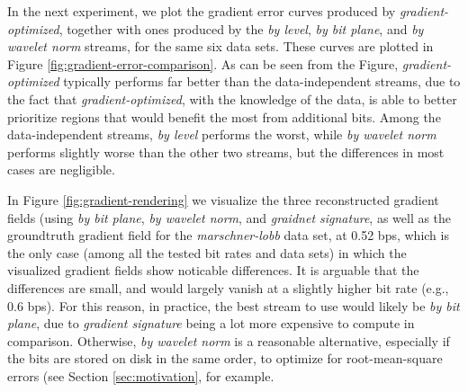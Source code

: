 In the next experiment, we plot the gradient error curves produced by \emph{gradient-optimized},
together with ones produced by the \emph{by level}, \emph{by bit plane}, and \emph{by wavelet norm}
streams, for the same six data sets. These curves are plotted in Figure
\ref{fig:gradient-error-comparison}. As can be seen from the Figure, \emph{gradient-optimized}
typically performs far better than the data-independent streams, due to the fact that
\emph{gradient-optimized}, with the knowledge of the data, is able to better prioritize regions that
would benefit the most from additional bits. Among the data-independent streams, \emph{by level}
performs the worst, while \emph{by wavelet norm} performs slightly worse than the other two streams,
but the differences in most cases are negligible.

In Figure \ref{fig:gradient-rendering} we visualize the three reconstructed gradient fields (using
\emph{by bit plane}, \emph{by wavelet norm}, and \emph{graidnet signature}, as well as the
groundtruth gradient field for the \emph{marschner-lobb} data set, at 0.52 bps, which is the only
case (among all the tested bit rates and data sets) in which the visualized gradient fields show
noticable differences. It is arguable that the differences are small, and would largely vanish at a
slightly higher bit rate (e.g., 0.6 bps). For this reason, in practice, the best stream to use would
likely be \emph{by bit plane}, due to \emph{gradient signature} being a lot more expensive to
compute in comparison. Otherwise, \emph{by wavelet norm} is a reasonable alternative, especially if
the bits are stored on disk in the same order, to optimize for root-mean-square errors (see Section
\ref{sec:motivation}, for example.

